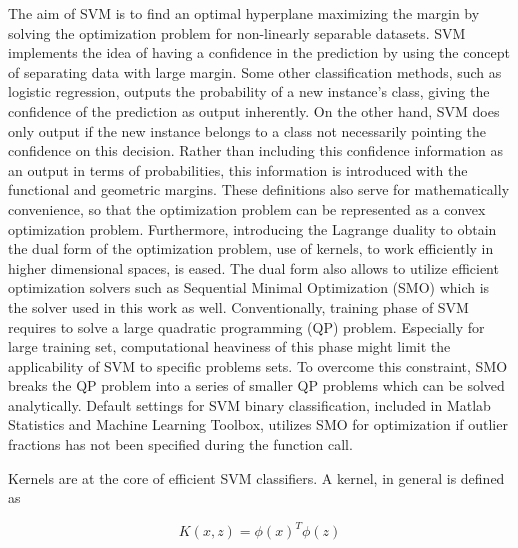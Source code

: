 The aim of SVM is to find an optimal hyperplane maximizing the margin by solving the optimization problem for non-linearly separable datasets. 
SVM implements the idea of having a confidence in the prediction by using the concept of separating data with large margin. 
Some other classification methods, such as logistic regression, outputs the probability of a new instance's class, giving the confidence of the prediction as output inherently. 
On the other hand, SVM does only output if the new instance belongs to a class not necessarily pointing the confidence on this decision. 
Rather than including this confidence information as an output in terms of probabilities, this information is introduced with the functional and geometric margins. 
These definitions also serve for mathematically convenience, so that the optimization problem can be represented as a convex optimization problem.
Furthermore, introducing the Lagrange duality to obtain the dual form of the optimization problem, use of kernels, to work efficiently in higher dimensional spaces, is eased. 
The dual form also allows to utilize efficient optimization solvers such as Sequential Minimal Optimization (SMO)  \cite{platt1998sequential} which is the solver used in this work as well. Conventionally, training phase of SVM requires to solve a large quadratic programming (QP) problem. Especially for large training set, computational heaviness of this phase might limit the applicability of SVM to specific problems sets. To overcome this constraint, SMO breaks the QP problem into a series of smaller QP problems which can be solved analytically. Default settings for SVM binary classification, included in Matlab Statistics and Machine Learning Toolbox, utilizes SMO for optimization if outlier fractions has not been specified during the function call. 


Kernels are at the core of efficient SVM classifiers. A kernel, in general is defined as

\begin{equation}
K (x,z) = {\phi(x)}^T \phi(z)
\end{equation}

